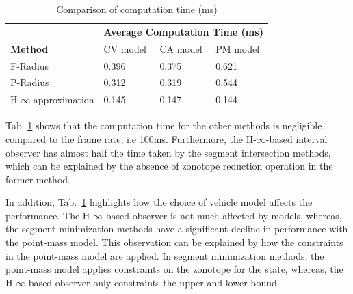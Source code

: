 \begin{table}[!h]
\caption{Comparison of computation time (ms)\\}
	\centering
	\renewcommand{\arraystretch}{1.1}
	\small	
	\begin{tabular}{l l l l}
		\toprule
		& \multicolumn{3}{c}{\textbf{Average Computation Time (ms)}}\\
		\textbf{Method} & CV model & CA model & PM model\\ \midrule
		F-Radius & 0.396 & 0.375 & 0.621 \\
		P-Radius & 0.312 & 0.319 & 0.544\\
		H-$\infty$ approximation & 0.145 & 0.147 & 0.144\\
		\bottomrule
	\end{tabular}
	\label{tab:comptime}
\end{table}
Tab. \ref{tab:comptime} shows that the computation time for the other methods is negligible compared to the frame rate, i.e 100ms. Furthermore, the H-$\infty$-based interval observer has almost half the time taken by the segment intersection methods, which can be explained by the absence of zonotope reduction operation in the former method. 

In addition, Tab.~\ref{tab:comptime} highlights how the choice of vehicle model affects the performance. The H-$\infty$-based observer is not much affected by models, whereas, the segment minimization methods have a significant decline in performance with the point-mass model. This observation can be explained by how the constraints in the point-mass model are applied. In segment minimization methods, the point-mass model applies constraints on the zonotope for the state, whereas, the H-$\infty$-based observer only constraints the upper and lower bound. 

